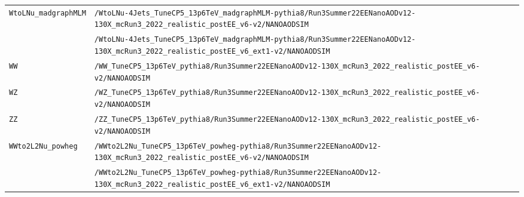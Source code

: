 \begin{longtable}{@{}>{\RaggedRight\arraybackslash}p{} >{\RaggedRight\arraybackslash}p{}@{}}
\addlinespace[2pt]
\texttt{WtoLNu\_\allowbreak{}madgraphMLM} & \texttt{/\allowbreak{}WtoLNu-\allowbreak{}4Jets\_\allowbreak{}TuneCP5\_\allowbreak{}13p6TeV\_\allowbreak{}madgraphMLM-\allowbreak{}pythia8/\allowbreak{}Run3Summer22EENanoAODv12-\allowbreak{}130X\_\allowbreak{}mcRun3\_\allowbreak{}2022\_\allowbreak{}realistic\_\allowbreak{}postEE\_\allowbreak{}v6-\allowbreak{}v2/\allowbreak{}NANOAODSIM} \\
 & \texttt{/\allowbreak{}WtoLNu-\allowbreak{}4Jets\_\allowbreak{}TuneCP5\_\allowbreak{}13p6TeV\_\allowbreak{}madgraphMLM-\allowbreak{}pythia8/\allowbreak{}Run3Summer22EENanoAODv12-\allowbreak{}130X\_\allowbreak{}mcRun3\_\allowbreak{}2022\_\allowbreak{}realistic\_\allowbreak{}postEE\_\allowbreak{}v6\_\allowbreak{}ext1-\allowbreak{}v2/\allowbreak{}NANOAODSIM} \\
\addlinespace[2pt]
\texttt{WW} & \texttt{/\allowbreak{}WW\_\allowbreak{}TuneCP5\_\allowbreak{}13p6TeV\_\allowbreak{}pythia8/\allowbreak{}Run3Summer22EENanoAODv12-\allowbreak{}130X\_\allowbreak{}mcRun3\_\allowbreak{}2022\_\allowbreak{}realistic\_\allowbreak{}postEE\_\allowbreak{}v6-\allowbreak{}v2/\allowbreak{}NANOAODSIM} \\
\addlinespace[2pt]
\texttt{WZ} & \texttt{/\allowbreak{}WZ\_\allowbreak{}TuneCP5\_\allowbreak{}13p6TeV\_\allowbreak{}pythia8/\allowbreak{}Run3Summer22EENanoAODv12-\allowbreak{}130X\_\allowbreak{}mcRun3\_\allowbreak{}2022\_\allowbreak{}realistic\_\allowbreak{}postEE\_\allowbreak{}v6-\allowbreak{}v2/\allowbreak{}NANOAODSIM} \\
\addlinespace[2pt]
\texttt{ZZ} & \texttt{/\allowbreak{}ZZ\_\allowbreak{}TuneCP5\_\allowbreak{}13p6TeV\_\allowbreak{}pythia8/\allowbreak{}Run3Summer22EENanoAODv12-\allowbreak{}130X\_\allowbreak{}mcRun3\_\allowbreak{}2022\_\allowbreak{}realistic\_\allowbreak{}postEE\_\allowbreak{}v6-\allowbreak{}v2/\allowbreak{}NANOAODSIM} \\
\addlinespace[2pt]
\texttt{WWto2L2Nu\_\allowbreak{}powheg} & \texttt{/\allowbreak{}WWto2L2Nu\_\allowbreak{}TuneCP5\_\allowbreak{}13p6TeV\_\allowbreak{}powheg-\allowbreak{}pythia8/\allowbreak{}Run3Summer22EENanoAODv12-\allowbreak{}130X\_\allowbreak{}mcRun3\_\allowbreak{}2022\_\allowbreak{}realistic\_\allowbreak{}postEE\_\allowbreak{}v6-\allowbreak{}v2/\allowbreak{}NANOAODSIM} \\
 & \texttt{/\allowbreak{}WWto2L2Nu\_\allowbreak{}TuneCP5\_\allowbreak{}13p6TeV\_\allowbreak{}powheg-\allowbreak{}pythia8/\allowbreak{}Run3Summer22EENanoAODv12-\allowbreak{}130X\_\allowbreak{}mcRun3\_\allowbreak{}2022\_\allowbreak{}realistic\_\allowbreak{}postEE\_\allowbreak{}v6\_\allowbreak{}ext1-\allowbreak{}v2/\allowbreak{}NANOAODSIM} \\

\end{longtable}
